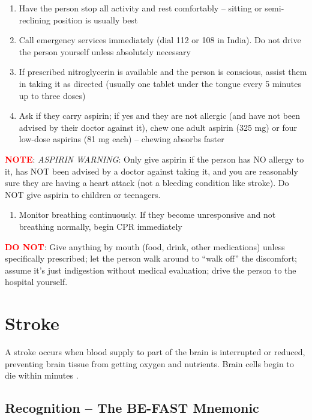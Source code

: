 \begin{enumerate}[leftmargin=*]
\item Have the person stop all activity and rest comfortably -- sitting or semi-reclining position is usually best
\item Call emergency services immediately (dial 112 or 108 in India). Do not drive the person yourself unless absolutely necessary
\item If prescribed nitroglycerin is available and the person is conscious, assist them in taking it as directed (usually one tablet under the tongue every 5 minutes up to three doses)
\item Ask if they carry aspirin; if yes and they are not allergic (and have not been advised by their doctor against it), chew one adult aspirin (325 mg) or four low-dose aspirins (81 mg each) -- chewing absorbs faster \cite{aha_arc_2024}
\end{enumerate}
\noindent\textbf{\textcolor{red}{NOTE}}: \textit{ASPIRIN WARNING}: Only give aspirin if the person has NO allergy to it, has NOT been advised by a doctor against taking it, and you are reasonably sure they are having a heart attack (not a bleeding condition like stroke). Do NOT give aspirin to children or teenagers.

\begin{enumerate}[leftmargin=*]
\item Monitor breathing continuously. If they become unresponsive and not breathing normally, begin CPR immediately
\end{enumerate}
\noindent\textbf{\textcolor{red}{DO NOT}}: Give anything by mouth (food, drink, other medications) unless specifically prescribed; let the person walk around to ``walk off'' the discomfort; assume it's just indigestion without medical evaluation; drive the person to the hospital yourself.

\section{Stroke}

A stroke occurs when blood supply to part of the brain is interrupted or reduced, preventing brain tissue from getting oxygen and nutrients. Brain cells begin to die within minutes \cite{nih_stroke}.

\subsection{Recognition -- The BE-FAST Mnemonic}

